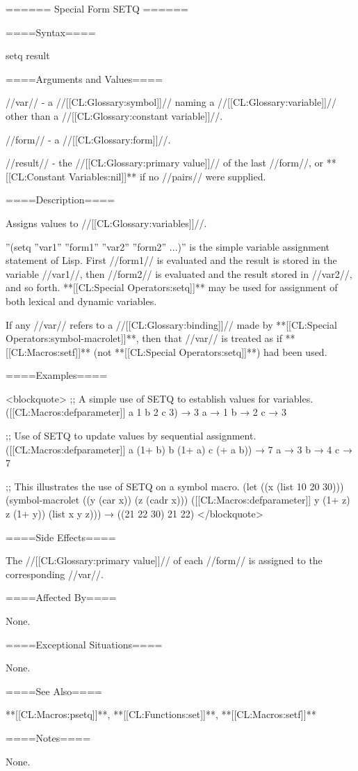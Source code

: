 ====== Special Form SETQ ======

====Syntax====

\DefspecWithValues setq {} {result}


====Arguments and Values====

//var// - a //[[CL:Glossary:symbol]]// naming a //[[CL:Glossary:variable]]// other than a //[[CL:Glossary:constant variable]]//.

//form// - a //[[CL:Glossary:form]]//.

//result// - the //[[CL:Glossary:primary value]]// of the last //form//, or **[[CL:Constant Variables:nil]]** if no //pairs// were supplied.

====Description====

Assigns values to //[[CL:Glossary:variables]]//.

''(setq ''var1'' ''form1'' ''var2'' ''form2'' ...)'' is the simple variable assignment statement of Lisp. First //form1// is evaluated and the result is stored in the variable //var1//, then //form2// is evaluated and the result stored in //var2//, and so forth. **[[CL:Special Operators:setq]]** may be used for assignment of both lexical and dynamic variables.

If any //var// refers to a //[[CL:Glossary:binding]]// made by **[[CL:Special Operators:symbol-macrolet]]**, then that //var// is treated as if **[[CL:Macros:setf]]** (not **[[CL:Special Operators:setq]]**) had been used.

====Examples====

<blockquote> ;; A simple use of SETQ to establish values for variables. ([[CL:Macros:defparameter]] a 1 b 2 c 3) → 3 a → 1 b → 2 c → 3

;; Use of SETQ to update values by sequential assignment. ([[CL:Macros:defparameter]] a (1+ b) b (1+ a) c (+ a b)) → 7 a → 3 b → 4 c → 7

;; This illustrates the use of SETQ on a symbol macro. (let ((x (list 10 20 30))) (symbol-macrolet ((y (car x)) (z (cadr x))) ([[CL:Macros:defparameter]] y (1+ z) z (1+ y)) (list x y z))) → ((21 22 30) 21 22) </blockquote>

====Side Effects====

The //[[CL:Glossary:primary value]]// of each //form// is assigned to the corresponding //var//.

====Affected By====

None.

====Exceptional Situations====

None.

====See Also====

**[[CL:Macros:psetq]]**, **[[CL:Functions:set]]**, **[[CL:Macros:setf]]**

====Notes====

None.

